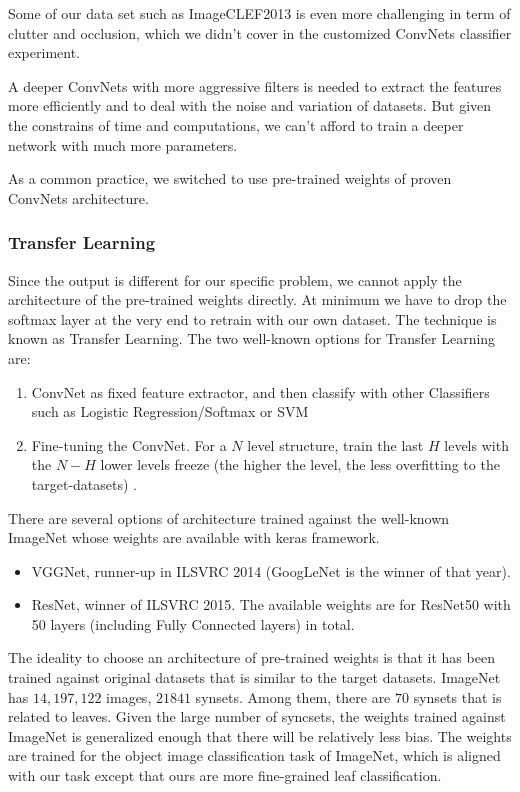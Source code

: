 \documentclass[journal, 10pt]{IEEEtran}
\begin{document}
  Some of our data set such as ImageCLEF2013 is even more challenging in term of clutter and occlusion, which we didn't cover in the customized ConvNets classifier experiment.

  A deeper ConvNets with more aggressive filters is needed to extract the features more efficiently and to deal with the noise and variation of datasets. But given the constrains of time and computations, we can't afford to train a deeper network with much more parameters.

  As a common practice, we switched to use pre-trained weights of proven ConvNets architecture.

  \subsubsection{Transfer Learning}
  Since the output is different for our specific problem, we cannot apply the architecture of the pre-trained weights directly. At minimum we have to drop the softmax layer at the very end to retrain with our own dataset. The technique is known as Transfer Learning. The two well-known options for Transfer Learning are:
  \begin{enumerate}
    \item ConvNet as fixed feature extractor, and then classify with other Classifiers such as Logistic Regression/Softmax or SVM
    \item Fine-tuning the ConvNet. For a $N$ level structure, train the last $H$ levels with the $N-H$ lower levels freeze (the higher the level, the less overfitting to the target-datasets) \cite{CS231N}.
  \end{enumerate}

  There are several options of architecture trained against the well-known ImageNet whose weights are available with keras framework.
  \begin{itemize}
    \item VGGNet, runner-up in ILSVRC 2014 (GoogLeNet is the winner of that year).
    \item ResNet, winner of ILSVRC 2015. The available weights are for ResNet50 with 50 layers (including Fully Connected layers) in total.
  \end{itemize}

  The ideality to choose an architecture of pre-trained weights is that it has been trained against original datasets that is similar to the target datasets. ImageNet has $14,197,122$ images, $21841$ synsets. Among them, there are $70$ synsets that is related to leaves. Given the large number of syncsets, the weights trained against ImageNet is generalized enough that there will be relatively less bias. The weights are trained for the object image classification task of ImageNet, which is aligned with our task except that ours are more fine-grained leaf classification.
\end{document}

